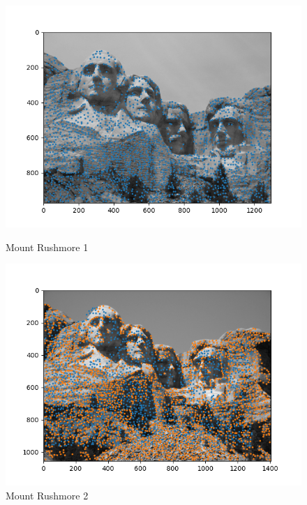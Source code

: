 \begin{figure}[h!]
    \begin{minipage}[b]{0.3\textwidth}
        \includegraphics[width=\textwidth]{imgs/mt_rushmore1.png}
        \caption{Mount Rushmore 1}
    \end{minipage}
    \begin{minipage}[b]{0.3\textwidth}
        \includegraphics[width=\textwidth]{imgs/mt_rushmore2.png}
        \caption{Mount Rushmore 2}
    \end{minipage}
    \begin{minipage}[b]{0.3\textwidth}

\end{minipage}
\end{figure}
